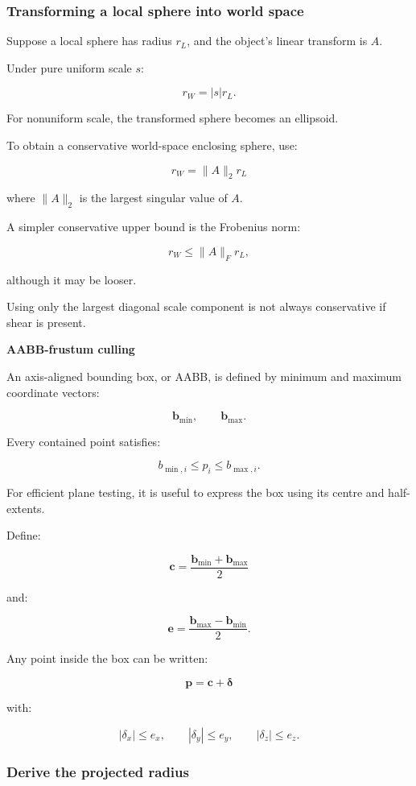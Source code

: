 \subsubsection{Transforming a local sphere into world space}\label{transforming-a-local-sphere-into-world-space}

Suppose a local sphere has radius \(r_L\), and the object's linear transform is \(A\).

Under pure uniform scale \(s\):

\[
 r_W=|s|r_L.
\]

For nonuniform scale, the transformed sphere becomes an ellipsoid.

To obtain a conservative world-space enclosing sphere, use:

\[
 \boxed{ r_W=\|A\|_2r_L }
\]

where \(\|A\|_2\) is the largest singular value of \(A\).

A simpler conservative upper bound is the Frobenius norm:

\[
 r_W\le\|A\|_Fr_L,
\]

although it may be looser.

Using only the largest diagonal scale component is not always conservative if shear is present.

\textbf{AABB-frustum culling}

An axis-aligned bounding box, or AABB, is defined by minimum and maximum coordinate vectors:

\[
 \mathbf b_{\min}, \qquad \mathbf b_{\max}.
\]

Every contained point satisfies:

\[
 b_{\min,i}\le p_i\le b_{\max,i}.
\]

For efficient plane testing, it is useful to express the box using its centre and half-extents.

Define:

\[
 \boxed{ \mathbf c= \frac{\mathbf b_{\min}+\mathbf b_{\max}}2 }
\]

and:

\[
 \boxed{ \mathbf e= \frac{\mathbf b_{\max}-\mathbf b_{\min}}2 }.
\]

Any point inside the box can be written:

\[
 \mathbf p=\mathbf c+\boldsymbol\delta
\]

with:

\[
 |\delta_x|\le e_x, \qquad |\delta_y|\le e_y, \qquad |\delta_z|\le e_z.
\]

\subsubsection{Derive the projected radius}\label{derive-the-projected-radius}

